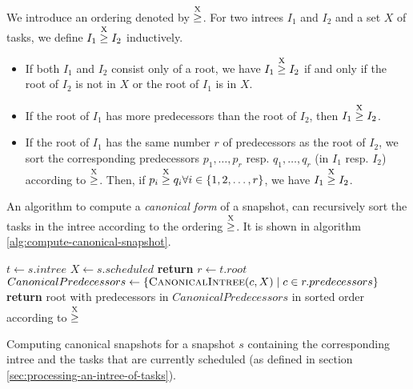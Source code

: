 \begin{definition}
  We introduce an ordering denoted by $\stackrel{\text{X}}{\geq}$. For two intrees $I_1$ and $I_2$ and a set $X$ of tasks, we define $I_1 \stackrel{\text{X}}{\geq} I_2$ inductively. 
  \begin{itemize}
  \item If both $I_1$ and $I_2$ consist only of a root, we have $I_1 \stackrel{\text{X}}{\geq} I_2$ if and only if the root of $I_2$ is not in $X$ or the root of $I_1$ is in $X$.
  \item If the root of $I_1$ has more predecessors than the root of $I_2$, then $I_1 \stackrel{\text{X}}{\geq} I_2$.
  \item If the root of $I_1$ has the same number $r$ of predecessors as the root of $I_2$, we sort the corresponding predecessors $p_1,\dots,p_r$ resp. $q_1,\dots,q_r$ (in $I_1$ resp. $I_2$) according to $\stackrel{\text{X}}{\geq}$. Then, if $p_i \stackrel{\text{X}}{\geq} q_i \forall i\in\{1,2,\dots,r \}$, we have $I_1 \stackrel{\text{X}}{\geq} I_2$.
  \end{itemize}
\end{definition}


An algorithm to compute a \emph{canonical form} of a snapshot, can recursively sort the tasks in the intree according to the ordering $\stackrel{\text{X}}{\geq}$. It is shown in algorithm \ref{alg:compute-canonical-snapshot}.

\begin{algorithm}
  \begin{algorithmic}
     
    \State $t \gets s.intree$ 
    \State $X \gets s.scheduled$ 
    \State \textbf{return}  
    \EndProcedure
    \Statex
    \State $r \gets t.root$ 
    \State $CanonicalPredecessors \gets 
           \left\{ \Call{CanonicalIntree}{c, X} \mid c \in r.predecessors \right\}$
    \State \textbf{return} root with predecessors in $CanonicalPredecessors$ in sorted order according to $\stackrel{\text{X}}{\geq}$
    \EndProcedure
    \Statex
  \end{algorithmic}
  \caption{Computing canonical snapshots for a snapshot $s$ containing the corresponding intree and the tasks that are currently scheduled (as defined in section \ref{sec:processing-an-intree-of-tasks}).}
  \label{alg:compute-canonical-snapshot}
\end{algorithm}

